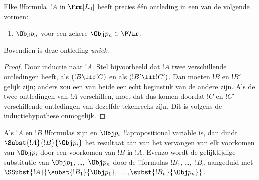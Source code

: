 \documentclass[../../../include/open-logic-section]{subfiles}
\begin{document}
\begin{prop}
Elke !!{formula}~$!A$ in $ \Frm[L_0]$ heeft precies één ontleding in
een van de volgende vormen:
\begin{enumerate}


\item $\Obj p_n$ voor een zekere $\Obj p_n \in  \PVar$.
  




\end{enumerate}
Bovendien is deze ontleding \emph{uniek}.
\end{prop}

\begin{proof}
Door inductie naar $!A$. Stel bijvoorbeeld dat $!A$ twee verschillende
ontledingen heeft, als $(!B \lif !C)$ en als $(!B' \lif !C')$. Dan
moeten $!B$ en $!B'$ gelijk zijn; anders zou een van beide een echt
beginstuk van de andere zijn. Als de twee ontledingen van $!A$
verschillen, moet dat dus komen doordat $!C$ en $!C'$ verschillende
ontledingen van dezelfde tekenreeks zijn. Dit is volgens de
inductiehypothese onmogelijk.
\end{proof}


\begin{defn}
Als $!A$ en $!B$ !!{formula}s zijn en $\Obj p_i$ !!a{propositional
  variable} is, dan duidt $\Subst{!A}{!B}{\Obj p_i}$ het resultaat aan
  van het vervangen van elk voorkomen van $\Obj p_i$ door een voorkomen
  van $!B$ in $!A$. Evenzo wordt de gelijktijdige substitutie van
$\Obj p_1$, \dots,~$\Obj p_n$ door de !!{formula}s $!B_1$,
\dots,~$!B_n$ aangeduid met
$\SSubst{!A}{\subst{!B_1}{\Obj p_1},\dots,\subst{!B_n}{\Obj p_n}}$.
\end{defn}
\end{document}
